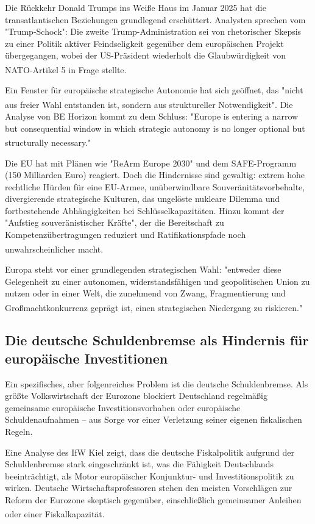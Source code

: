 \documentclass[12pt,a4paper]{article}
\newcommand{\footcite}[1]{\textsuperscript{\cite{#1}}}
\begin{document}
	Die Rückkehr Donald Trumps ins Weiße Haus im Januar 2025 hat die transatlantischen Beziehungen grundlegend erschüttert. Analysten sprechen vom "Trump-Schock": Die zweite Trump-Administration sei von rhetorischer Skepsis zu einer Politik aktiver Feindseligkeit gegenüber dem europäischen Projekt übergegangen, wobei der US-Präsident wiederholt die Glaubwürdigkeit von NATO-Artikel 5 in Frage stellte.\footcite{Behorizon2026}
	
	Ein Fenster für europäische strategische Autonomie hat sich geöffnet, das "nicht aus freier Wahl entstanden ist, sondern aus struktureller Notwendigkeit".\footcite{Behorizon2026} Die Analyse von BE Horizon kommt zu dem Schluss: "Europe is entering a narrow but consequential window in which strategic autonomy is no longer optional but structurally necessary."\footcite{Behorizon2026}
	
	Die EU hat mit Plänen wie "ReArm Europe 2030" und dem SAFE-Programm (150 Milliarden Euro) reagiert. Doch die Hindernisse sind gewaltig: extrem hohe rechtliche Hürden für eine EU-Armee, unüberwindbare Souveränitätsvorbehalte, divergierende strategische Kulturen, das ungelöste nukleare Dilemma und fortbestehende Abhängigkeiten bei Schlüsselkapazitäten. Hinzu kommt der "Aufstieg souveränistischer Kräfte", der die Bereitschaft zu Kompetenzübertragungen reduziert und Ratifikationspfade noch unwahrscheinlicher macht.\footcite{Wind2026}
	
	Europa steht vor einer grundlegenden strategischen Wahl: "entweder diese Gelegenheit zu einer autonomen, widerstandsfähigen und geopolitischen Union zu nutzen oder in einer Welt, die zunehmend von Zwang, Fragmentierung und Großmachtkonkurrenz geprägt ist, einen strategischen Niedergang zu riskieren."\footcite{Behorizon2026}
	
	\subsection{Die deutsche Schuldenbremse als Hindernis für europäische Investitionen}
	
	Ein spezifisches, aber folgenreiches Problem ist die deutsche Schuldenbremse. Als größte Volkswirtschaft der Eurozone blockiert Deutschland regelmäßig gemeinsame europäische Investitionsvorhaben oder europäische Schuldenaufnahmen – aus Sorge vor einer Verletzung seiner eigenen fiskalischen Regeln.
	
	Eine Analyse des IfW Kiel zeigt, dass die deutsche Fiskalpolitik aufgrund der Schuldenbremse stark eingeschränkt ist, was die Fähigkeit Deutschlands beeinträchtigt, als Motor europäischer Konjunktur- und Investitionspolitik zu wirken. Deutsche Wirtschaftsprofessoren stehen den meisten Vorschlägen zur Reform der Eurozone skeptisch gegenüber, einschließlich gemeinsamer Anleihen oder einer Fiskalkapazität.\footcite{Ifo2018}
	
\end{document}
